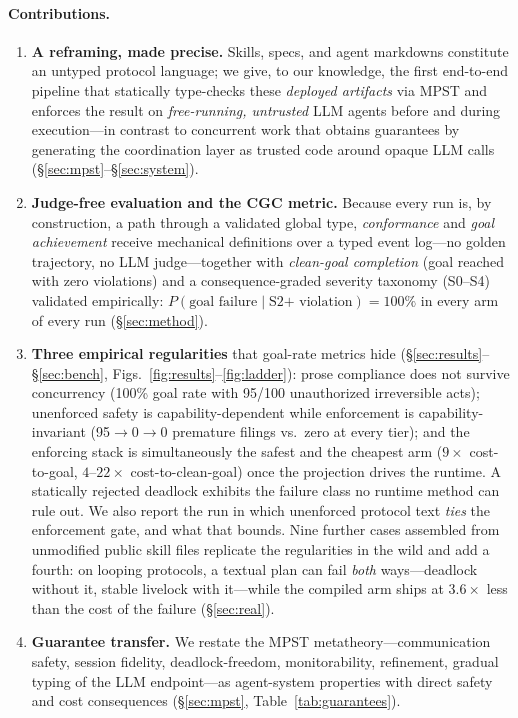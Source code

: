 \documentclass{article}
\begin{document}
\paragraph{Contributions.}
\begin{enumerate}\itemsep2pt
\item \textbf{A reframing, made precise.} Skills, specs, and agent markdowns constitute an untyped protocol language; we give, to our knowledge, the first end-to-end pipeline that statically type-checks these \emph{deployed artifacts} via MPST and enforces the result on \emph{free-running, untrusted} LLM agents before and during execution---in contrast to concurrent work that obtains guarantees by generating the coordination layer as trusted code around opaque LLM calls \citep{bollig26} (\S\ref{sec:mpst}--\S\ref{sec:system}).
\item \textbf{Judge-free evaluation and the CGC metric.} Because every run is, by construction, a path through a validated global type, \emph{conformance} and \emph{goal achievement} receive mechanical definitions over a typed event log---no golden trajectory, no LLM judge---together with \emph{clean-goal completion} (goal reached with zero violations) and a consequence-graded severity taxonomy (S0--S4) validated empirically: $P(\text{goal failure}\mid\text{S2+ violation})=100\%$ in every arm of every run (\S\ref{sec:method}).
\item \textbf{Three empirical regularities} that goal-rate metrics hide (\S\ref{sec:results}--\S\ref{sec:bench}, Figs.~\ref{fig:results}--\ref{fig:ladder}): prose compliance does not survive concurrency (100\% goal rate with 95/100 unauthorized irreversible acts); unenforced safety is capability-dependent while enforcement is capability-invariant (95$\to$0$\to$0 premature filings vs.\ zero at every tier); and the enforcing stack is simultaneously the safest and the cheapest arm ($9\times$ cost-to-goal, $4$--$22\times$ cost-to-clean-goal) once the projection drives the runtime. A statically rejected deadlock exhibits the failure class no runtime method can rule out. We also report the run in which unenforced protocol text \emph{ties} the enforcement gate, and what that bounds. Nine further cases assembled from unmodified public skill files replicate the regularities in the wild and add a fourth: on looping protocols, a textual plan can fail \emph{both} ways---deadlock without it, stable livelock with it---while the compiled arm ships at $3.6\times$ less than the cost of the failure (\S\ref{sec:real}).
\item \textbf{Guarantee transfer.} We restate the MPST metatheory---communication safety, session fidelity, deadlock-freedom, monitorability, refinement, gradual typing of the LLM endpoint---as agent-system properties with direct safety and cost consequences (\S\ref{sec:mpst}, Table~\ref{tab:guarantees}).

\end{enumerate}
\end{document}
